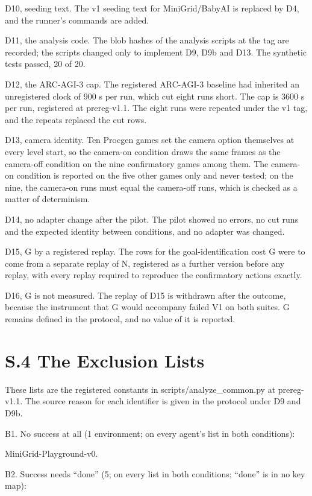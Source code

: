 \documentclass[journal,onecolumn]{IEEEtran}
\begin{document}
D10, seeding text. The v1 seeding text for MiniGrid/BabyAI is replaced
by D4, and the runner's commands are added.

D11, the analysis code. The blob hashes of the analysis scripts at the
tag are recorded; the scripts changed only to implement D9, D9b and D13.
The synthetic tests passed, 20 of 20.

D12, the ARC-AGI-3 cap. The registered ARC-AGI-3 baseline had inherited
an unregistered clock of 900 s per run, which cut eight runs short. The
cap is 3600 s per run, registered at prereg-v1.1. The eight runs were
repeated under the v1 tag, and the repeats replaced the cut rows.

D13, camera identity. Ten Procgen games set the camera option themselves
at every level start, so the camera-on condition draws the same frames
as the camera-off condition on the nine confirmatory games among them.
The camera-on condition is reported on the five other games only and
never tested; on the nine, the camera-on runs must equal the camera-off
runs, which is checked as a matter of determinism.

D14, no adapter change after the pilot. The pilot showed no errors, no
cut runs and the expected identity between conditions, and no adapter
was changed.

D15, G by a registered replay. The rows for the goal-identification cost
G were to come from a separate replay of N, registered as a further
version before any replay, with every replay required to reproduce the
confirmatory actions exactly.

D16, G is not measured. The replay of D15 is withdrawn after the
outcome, because the instrument that G would accompany failed V1 on both
suites. G remains defined in the protocol, and no value of it is
reported.

\section*{S.4 The Exclusion Lists}\label{s.4-the-exclusion-lists}

These lists are the registered constants in scripts/analyze\_common.py
at prereg-v1.1. The source reason for each identifier is given in the
protocol under D9 and D9b.

B1. No success at all (1 environment; on every agent's list in both
conditions):

MiniGrid-Playground-v0.

B2. Success needs ``done'' (5; on every list in both conditions;
``done'' is in no key map):
\end{document}

